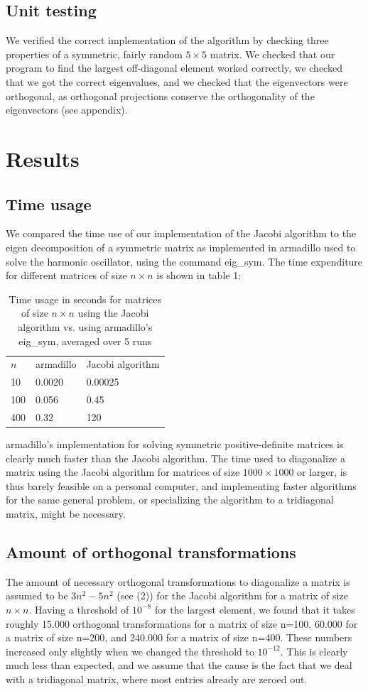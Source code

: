 \documentclass[10pt,a4paper]{article}
\begin{document}
\subsection{Unit testing}
We verified the correct implementation of the algorithm by checking three properties of a symmetric, fairly random $5\times 5$ matrix. We checked that our program to find the largest off-diagonal element worked correctly, we checked that we got the correct eigenvalues, and we checked that the eigenvectors were orthogonal, as orthogonal projections conserve the orthogonality of the eigenvectors (see appendix). 
\section{Results}
\subsection{Time usage}
We compared the time use of our implementation of the Jacobi algorithm to the eigen decomposition of a symmetric matrix as implemented in armadillo used to solve the harmonic oscillator, using the command eig\_sym. The time expenditure for different matrices of size $n\times n$ is shown in table 1:
\begin{table}[H]
\caption[Comparison of time use for algorithms]{Time usage in seconds for matrices of size $n\times n$ using the Jacobi algorithm vs. using armadillo's eig\_sym, averaged over 5 runs}
\begin{tabular}{lll}
$n$ &  armadillo & Jacobi algorithm \\
 10 & 0.0020 & 0.00025 \\
 100 & 0.056 & 0.45\\
 400 & 0.32 & 120
\end{tabular}
\end{table}
armadillo's implementation for solving symmetric positive-definite matrices is clearly much faster than the Jacobi algorithm. The time used to diagonalize a matrix  using the Jacobi algorithm for matrices of size $1000\times 1000$ or larger, is thus barely feasible on a personal computer, and implementing faster algorithms for the same general problem, or specializing the algorithm to a tridiagonal matrix, might be necessary. 
\subsection{Amount of orthogonal transformations}
The amount of necessary orthogonal transformations to diagonalize a matrix is assumed to be $3n^2-5n^2$ (see (2)) for the Jacobi algorithm for a matrix of size $n\times n$. Having a threshold of $10^{-8}$ for the largest element, we found that it takes roughly 15.000 orthogonal transformations for a matrix of size n=100, 60.000 for a matrix of size n=200, and 240.000 for a matrix of size n=400. These numbers increased only slightly when we changed the threshold to $10^{-12}$. This is clearly much less than expected, and we assume that the cause is the fact that we deal with a tridiagonal matrix, where most entries already are zeroed out. 
\end{document}
